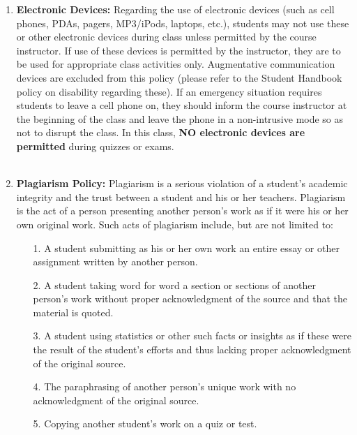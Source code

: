 \documentclass[10pt]{article}
\begin{document}
\begin{enumerate}
\begin{enumerate}[label=\alph*.]
         \item {\bf Electronic Devices:}
           Regarding the use of electronic devices (such as cell
           phones, PDAs, pagers, MP3/iPods, laptops, etc.), students
           may not use these or other electronic devices during class
           unless permitted by the course instructor. If use of these
           devices is permitted by the instructor, they are to be used
           for appropriate class activities only. Augmentative communication
           devices are excluded from this policy (please refer to the
           Student Handbook policy on disability regarding these). If
           an emergency situation requires students to leave a cell
           phone on, they should inform the course instructor at the
           beginning of the class and leave the phone in a
           non-intrusive mode so as not to disrupt the class.
           In this class, {\bf NO electronic devices are permitted}
           during quizzes or exams.  \\\\
         \item {\bf Plagiarism Policy: }
           Plagiarism is a serious violation of a student's academic
           integrity and the trust between a student and his or her
           teachers. Plagiarism is the act of a person presenting
           another person's work as if it were his or her own
           original work. Such acts of plagiarism include, but are
           not limited to: 
           \begin{enumerate}
           \item[1.] A student submitting as his or her own work an
             entire essay or other assignment written by another
             person. 
           \item[2.] A student taking word for word a section or
             sections of another person's work without proper
             acknowledgment of the source and that the material is
             quoted. 
           \item[3.] A student using statistics or other such facts
             or insights as if these were the result of the
             student's efforts and thus lacking proper
             acknowledgment of the original source. 
           \item[4.] The paraphrasing of another person's unique
             work with no acknowledgment of the original source. 
           \item[5.] Copying another student's work on a quiz or
             test. 
           \end{enumerate}


\end{enumerate}
\end{enumerate}
\end{document}
